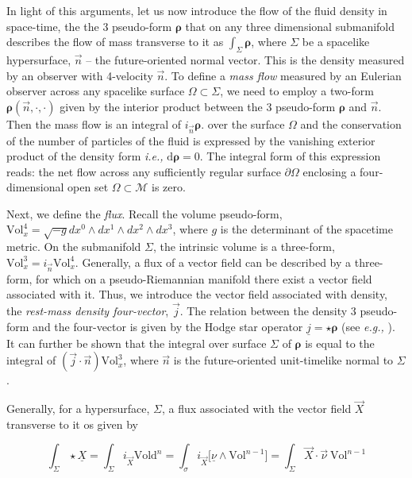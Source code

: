 \documentclass[11pt,a4paper,headinclude=true,DIV=14,BCOR=8mm,chapterprefix,listof=totoc,twoside,openright,abstracton]{scrbook}
\begin{document}
In light of this arguments, let us now introduce the flow of the fluid density in space-time, the  the 3 pseudo-form $\boldsymbol{\rho}$ that on any three dimensional submanifold describes the flow of mass transverse to it as $\int_{\Sigma} \boldsymbol{\rho}$, where $\Sigma$ be a spacelike hypersurface, $\vec{n}$ -- the future-oriented normal vector. This is the density measured by an observer with 4-velocity $\vec{n}$. To define a \textit{mass flow} measured by an Eulerian observer across any spacelike surface $\Omega\subset\Sigma$, we need to employ a two-form $\boldsymbol{\rho}(\vec{n}, \cdot, \cdot)$ given by the interior product between the 3 pseudo-form $\boldsymbol{\rho}$ and $\vec{n}$. Then the mass flow is an integral of $i_{\vec{n}}\boldsymbol{\rho}.$ over the surface $\Omega$ and the conservation of the number of particles of the fluid is expressed by the vanishing exterior product of the density form \textit{i.e.,} $\text{d}\boldsymbol{\rho}=0$. The integral form of this expression reads: the net flow across any sufficiently regular surface $\partial\Omega$ enclosing a four-dimensional open set $\Omega\subset\mathcal{M}$ is zero. 

Next, we define the \textit{flux}. Recall the volume pseudo-form, $\text{Vol}_x ^4 = \sqrt{-g}dx^0 \wedge dx^1 \wedge dx^2 \wedge dx^3$, where $g$ is the determinant of the spacetime metric. On the submanifold $\Sigma$, the intrinsic volume is a three-form, $\text{Vol}_x ^3 = i_{\vec{n}} \text{Vol}_x ^4$. Generally, a flux of a vector field can be described by a three-form, for which on a pseudo-Riemannian manifold there exist a vector field associated with it. Thus, we introduce the vector field associated with density, the \textit{rest-mass density four-vector}, $\vec{j}$. The relation between the density 3 pseudo-form and the four-vector is given by the Hodge star operator $\underline{j}=\star\boldsymbol{\rho}$ (see \textit{e.g.,} \cite{Frankel:2002}). It can further be shown that the integral over surface $\Sigma$ of $\boldsymbol{\rho}$ is equal to the integral of $(\vec{j}\cdot\vec{n})\text{Vol}_x ^3$, where $\vec{n}$ is the future-oriented unit-timelike normal to $\Sigma$.

Generally, for a hypersurface, $\Sigma$, a flux associated with the vector field $\vec{X}$ transverse to it os given by 

\begin{equation}
\int_{\Sigma} \star\underline{X} = \int_{\Sigma}i_{\vec{X}}\text{Vold}^n = \int_{\sigma}i_{\vec{X}}\big[\underline{\nu}\wedge\text{Vol}^{n-1}\big] = \int_{\Sigma}\vec{X}\cdot\vec{\nu}\:\text{Vol}^{n-1}
\label{eq:theory:flux_of_flow}
\end{equation}
\end{document}
